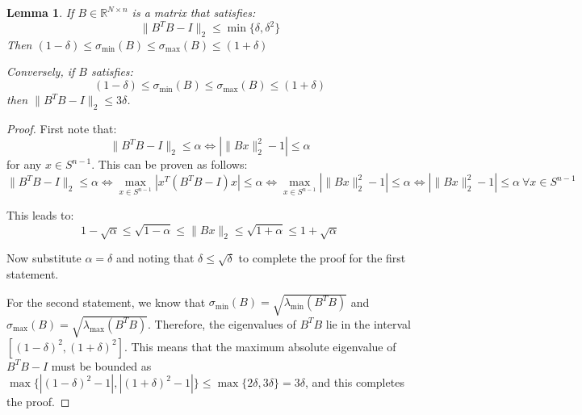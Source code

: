 \documentclass{article}
\newtheorem{lemma}{Lemma}[subsection]
\theoremstyle{remark}
\newcommand{\real}{\mathbb{R}}
\begin{document}
\begin{lemma}
\label{lem:approx-isometry}
If \(B \in \real^{N \times n}\) is a matrix that satisfies:
\begin{equation*}
\|B^{T}B - I\|_{2} \leq \min\{\delta, \delta^{2}\}
\end{equation*}
Then \((1 - \delta) \leq \sigma_{\min}(B) \leq \sigma_{\max}(B) \leq (1 + \delta)\)

Conversely, if \(B\) satisfies:
\begin{equation*}
(1 - \delta) \leq \sigma_{\min}(B) \leq \sigma_{\max}(B) \leq (1 + \delta)
\end{equation*}
then \(\|B^{T}B - I\|_{2} \leq 3\delta\).
\end{lemma}

\begin{proof}
First note that:
\begin{equation*}
\|B^{T}B - I\|_{2} \leq \alpha \Leftrightarrow |\|Bx\|_{2}^{2} - 1| \leq \alpha
\end{equation*}
for any \(x \in S^{n - 1}\).
This can be proven as follows:
\begin{equation*}
\|B^{T}B - I\|_{2} \leq \alpha \Leftrightarrow \max_{x \in S^{n-1}} |x^{T}(B^{T}B - I)x| \leq \alpha \Leftrightarrow \max_{x \in S^{n-1}} |\|Bx\|_{2}^{2} - 1| \leq \alpha \Leftrightarrow |\|Bx\|_{2}^{2} - 1| \leq \alpha ~\forall x \in S^{n-1}
\end{equation*}

This leads to:
\begin{equation*}
1 - \sqrt{\alpha} \leq \sqrt{1 - \alpha} \leq \|Bx\|_{2} \leq \sqrt{1 + \alpha} \leq 1 + \sqrt{\alpha}
\end{equation*}

Now substitute \(\alpha = \delta\) and noting that \(\delta \leq \sqrt{\delta}\) to complete the proof for the first statement.

For the second statement, we know that \(\sigma_{\min}(B) = \sqrt{\lambda_{\min}(B^{T}B)}\) and \(\sigma_{\max}(B) = \sqrt{\lambda_{\max}(B^{T}B)}\). Therefore, the eigenvalues of \(B^{T}B\) lie in the interval \([(1 - \delta)^{2}, (1 + \delta)^{2}]\). This means that the maximum absolute eigenvalue of \(B^{T}B - I\) must be bounded as \(\max\{|(1 - \delta)^{2} - 1|, |(1 + \delta)^{2} - 1|\} \leq \max\{2\delta, 3\delta\} = 3\delta\), and this completes the proof.
\end{proof}
\end{document}
